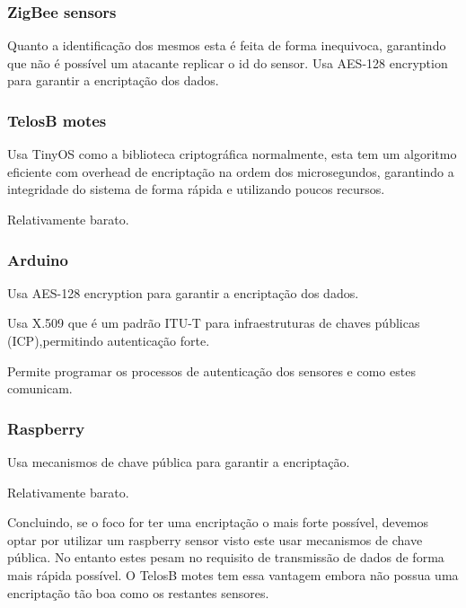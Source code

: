 \subsubsection{ZigBee sensors}
\par\hfill
\par Quanto a identificação dos mesmos esta é feita de forma inequivoca, garantindo que não é possível um atacante replicar o id do sensor.\newline 
Usa AES-128 encryption para garantir a encriptação dos dados.

\subsubsection{TelosB motes}
\par\hfill
\par Usa TinyOS como a biblioteca criptográfica normalmente, esta tem um algoritmo eficiente com overhead de encriptação na ordem dos microsegundos, garantindo a integridade do sistema de forma rápida e utilizando poucos recursos.\newline
\par Relativamente barato.

\subsubsection{Arduino}
\par\hfill
\par Usa AES-128 encryption para garantir a encriptação dos dados.\newline
\par Usa X.509 que é um padrão ITU-T para infraestruturas de chaves públicas (ICP),permitindo autenticação forte.
\par Permite programar os processos de autenticação dos sensores e como estes comunicam. 

\subsubsection{Raspberry}
\par\hfill
\par Usa mecanismos de chave pública para garantir a encriptação.
\par Relativamente barato.\newline


\par Concluindo, se o foco for ter uma encriptação o mais forte possível, devemos optar por utilizar um raspberry sensor visto este usar mecanismos de chave pública. No entanto estes pesam no requisito de transmissão de dados de forma mais rápida possível. O TelosB motes tem essa vantagem embora não possua uma encriptação tão boa como os restantes sensores.\newline


